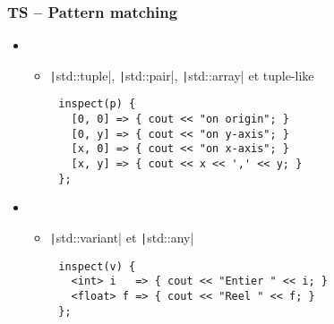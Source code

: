 \documentclass[C++.tex]{subfiles}
\begin{document}
\begin{frame}[fragile]
	\frametitle{TS -- Pattern matching}
	\begin{itemize}
		\item[]
		\begin{itemize}
			\item \texttt|std::tuple|, \texttt|std::pair|, \texttt|std::array| et tuple-like
		\end{itemize}
	\end{itemize}

	\begin{verbatim}
		inspect(p) {
		  [0, 0] => { cout << "on origin"; }
		  [0, y] => { cout << "on y-axis"; }
		  [x, 0] => { cout << "on x-axis"; }
		  [x, y] => { cout << x << ',' << y; }
		};
	\end{verbatim}

	\begin{itemize}
		\item []
		\begin{itemize}
			\item \texttt|std::variant| et \texttt|std::any|
		\end{itemize}
	\end{itemize}

	\begin{verbatim}
		inspect(v) {
		  <int> i   => { cout << "Entier " << i; }
		  <float> f => { cout << "Reel " << f; }
		};
	\end{verbatim}


\end{frame}
\end{document}
